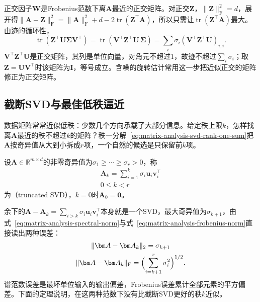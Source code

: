 正交因子$\bm W$是Frobenius范数下离$\bm A$最近的正交矩阵。对正交$\bm Z$，$\lVert\bm Z\rVert_{\mathrm F}^2=d$，展开得$\lVert\bm A-\bm Z\rVert_{\mathrm F}^2=\lVert\bm A\rVert_{\mathrm F}^2+d-2\operatorname{tr}(\bm Z^\top\bm A)$，所以只需让$\operatorname{tr}(\bm Z^\top\bm A)$最大。由迹的循环性，
\[
 \operatorname{tr}(\bm Z^\top\bm U\bm\Sigma\bm V^\top)=\operatorname{tr}(\bm V^\top\bm Z^\top\bm U\,\bm\Sigma)=\sum_i\sigma_i(\bm V^\top\bm Z^\top\bm U)_{i,i}.
\]
$\bm V^\top\bm Z^\top\bm U$是正交矩阵，其列是单位向量，对角元不超过$1$，故迹不超过$\sum_i\sigma_i$；取$\bm Z=\bm U\bm V^\top$时该矩阵为$\bm I$，等号成立。含噪的旋转估计常用这一步把近似正交的矩阵修正为正交矩阵。

\subsection{截断SVD与最佳低秩逼近}
\label{sec:ls-low-rank-solve}
\label{sec:ls-full-svd-solve}
\label{sec:matrix-analysis-svd-low-rank}

数据矩阵常常近似低秩：少数几个方向承载了大部分信息。给定秩上限$k$，怎样找离$\bm A$最近的秩不超过$k$的矩阵？秩一分解~\eqref{eq:matrix-analysis-svd-rank-one-sum}把$\bm A$按奇异值从大到小拆成$r$项，一个自然的候选是只保留前$k$项。

设$\bm A\in\mathbb R^{m\times d}$的非零奇异值为$\sigma_1\geq\cdots\geq\sigma_r>0$，称
\begin{equation}
\begin{gathered}
\bm A_k=\sum_{i=1}^k\sigma_i\bm u_i\bm v_i^\top\\
0\leq k<r
\end{gathered}
\label{eq:matrix-analysis-truncated-svd}
\end{equation}
为（truncated SVD），$k=0$时$\bm A_0=\bm0$。

余下的$\bm A-\bm A_k=\sum_{i>k}\sigma_i\bm u_i\bm v_i^\top$本身就是一个SVD，最大奇异值为$\sigma_{k+1}$，由式~\eqref{eq:matrix-analysis-spectral-norm}与式~\eqref{eq:matrix-analysis-frobenius-norm}直接读出两种误差：
\begin{equation}
\begin{gathered}
\lVert\bm A-\bm A_k\rVert_2=\sigma_{k+1}\\
\lVert\bm A-\bm A_k\rVert_{\mathrm F}
 =\Bigl(\sum_{i=k+1}^r\sigma_i^2\Bigr)^{1/2}.
\end{gathered}
\label{eq:ls-truncated-errors}
\end{equation}
谱范数误差是最坏单位输入的输出偏差，Frobenius误差累计全部元素的平方偏差。下面的定理说明，在这两种范数下没有比截断SVD更好的秩$k$近似。

